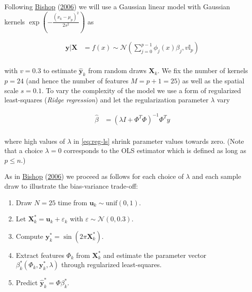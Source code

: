 \documentclass[
]{book}
\providecommand{\tightlist}{%
  \setlength{\itemsep}{0pt}\setlength{\parskip}{0pt}}
\begin{document}
Following \protect\hyperlink{ref-bishop2006pattern}{Bishop} (\protect\hyperlink{ref-bishop2006pattern}{2006}) we will use a Gaussian linear model with Gaussian kernels \(\exp(-\frac{(x_k-\mu_p)^{2}}{2s^2})\) as

\[
\begin{equation} 
\begin{aligned}
&& \mathbf{y}|\mathbf{X}& =f(x) \sim \mathcal{N} \left( \sum_{j=0}^{p-1} \phi_j(x)\beta_j, v \mathbb{I}_p \right) \\
\end{aligned}
\label{eq:model}
\end{equation}
\]

with \(v=0.3\) to estimate \(\hat{\mathbf{y}}_k\) from random draws \(\mathbf{X}_k\). We fix the number of kernels \(p=24\) (and hence the number of features \(M=p+1=25\)) as well as the spatial scale \(s=0.1\). To vary the complexity of the model we use a form of regularized least-squares (\emph{Ridge regression}) and let the regularization parameter \(\lambda\) vary

\[
\begin{equation} 
\begin{aligned}
&& \hat\beta&=(\lambda I + \Phi^T \Phi)^{-1}\Phi^Ty \\
\end{aligned}
\label{eq:reg-ls}
\end{equation}
\]

where high values of \(\lambda\) in \eqref{eq:reg-ls} shrink parameter values towards zero. (Note that a choice \(\lambda=0\) corresponds to the OLS estimator which is defined as long as \(p \le n\).)

As in \protect\hyperlink{ref-bishop2006pattern}{Bishop} (\protect\hyperlink{ref-bishop2006pattern}{2006}) we proceed as follows for each choice of \(\lambda\) and each sample draw to illustrate the bias-variance trade-off:

\begin{enumerate}
\def\labelenumi{\arabic{enumi}.}
\tightlist
\item
  Draw \(N=25\) time from \(\mathbf{u}_k \sim \text{unif}(0,1)\).
\item
  Let \(\mathbf{X}_k^*=\mathbf{u}_k+\varepsilon_k\) with \(\varepsilon \sim \mathcal{N}(0, 0.3)\).
\item
  Compute \(\mathbf{y}_k^*=\sin(2\pi \mathbf{X}^*_k)\).
\item
  Extract features \(\Phi_k\) from \(\mathbf{X}_k^*\) and estimate the parameter vector \(\beta_k^*(\Phi_k,\mathbf{y}^*_k,\lambda)\) through regularized least-squares.
\item
  Predict \(\hat{\mathbf{y}}_k^*=\Phi \beta_k^*\).
\end{enumerate}
\end{document}
